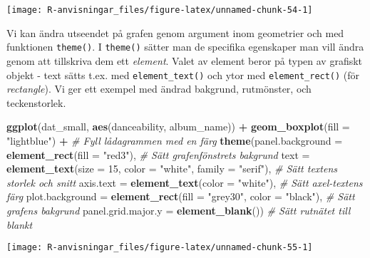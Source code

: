 \documentclass[
]{book}
\newenvironment{Shaded}{\begin{snugshade}}{\end{snugshade}}
\newcommand{\AttributeTok}[1]{\textcolor[rgb]{0.13,0.29,0.53}{#1}}
\newcommand{\CommentTok}[1]{\textcolor[rgb]{0.56,0.35,0.01}{\textit{#1}}}
\newcommand{\DecValTok}[1]{\textcolor[rgb]{0.00,0.00,0.81}{#1}}
\newcommand{\FunctionTok}[1]{\textcolor[rgb]{0.13,0.29,0.53}{\textbf{#1}}}
\newcommand{\NormalTok}[1]{#1}
\newcommand{\SpecialCharTok}[1]{\textcolor[rgb]{0.81,0.36,0.00}{\textbf{#1}}}
\newcommand{\StringTok}[1]{\textcolor[rgb]{0.31,0.60,0.02}{#1}}
\theoremstyle{definition}
\theoremstyle{definition}
\theoremstyle{definition}
\theoremstyle{definition}
\theoremstyle{remark}
\begin{document}
\begin{center}\texttt{[image: R-anvisningar\_files/figure-latex/unnamed-chunk-54-1]} \end{center}

Vi kan ändra utseendet på grafen genom argument inom geometrier och med funktionen \texttt{theme()}. I \texttt{theme()} sätter man de specifika egenskaper man vill ändra genom att tillskriva dem ett \emph{element}. Valet av element beror på typen av grafiskt objekt - text sätts t.ex. med \texttt{element\_text()} och ytor med \texttt{element\_rect()} (för \emph{rectangle}). Vi ger ett exempel med ändrad bakgrund, rutmönster, och teckenstorlek.

\begin{Shaded}
\begin{Highlighting}[]
\FunctionTok{ggplot}\NormalTok{(dat\_small, }\FunctionTok{aes}\NormalTok{(danceability, album\_name)) }\SpecialCharTok{+}
  \FunctionTok{geom\_boxplot}\NormalTok{(}\AttributeTok{fill =} \StringTok{"lightblue"}\NormalTok{) }\SpecialCharTok{+}                                         \CommentTok{\# Fyll lådagrammen med en färg}
  \FunctionTok{theme}\NormalTok{(}\AttributeTok{panel.background =} \FunctionTok{element\_rect}\NormalTok{(}\AttributeTok{fill =} \StringTok{"red3"}\NormalTok{),                      }\CommentTok{\# Sätt grafenfönstrets bakgrund}
        \AttributeTok{text =} \FunctionTok{element\_text}\NormalTok{(}\AttributeTok{size =} \DecValTok{15}\NormalTok{, }\AttributeTok{color =} \StringTok{"white"}\NormalTok{, }\AttributeTok{family =} \StringTok{"serif"}\NormalTok{),   }\CommentTok{\# Sätt textens storlek och snitt}
        \AttributeTok{axis.text =} \FunctionTok{element\_text}\NormalTok{(}\AttributeTok{color =} \StringTok{"white"}\NormalTok{),                           }\CommentTok{\# Sätt axel{-}textens färg}
        \AttributeTok{plot.background =} \FunctionTok{element\_rect}\NormalTok{(}\AttributeTok{fill =} \StringTok{"grey30"}\NormalTok{, }\AttributeTok{color =} \StringTok{"black"}\NormalTok{),    }\CommentTok{\# Sätt grafens bakgrund}
        \AttributeTok{panel.grid.major.y =} \FunctionTok{element\_blank}\NormalTok{())                                }\CommentTok{\# Sätt rutnätet till blankt}
\end{Highlighting}
\end{Shaded}

\begin{center}\texttt{[image: R-anvisningar\_files/figure-latex/unnamed-chunk-55-1]} \end{center}
\end{document}
